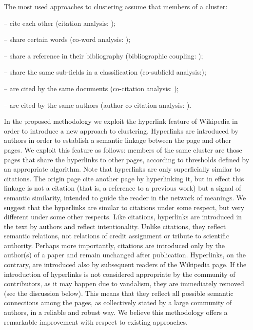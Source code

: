 \documentclass[b5paper,]{book}
\theoremstyle{definition}
\theoremstyle{definition}
\theoremstyle{definition}
\theoremstyle{remark}
\begin{document}
The most used approaches to clustering assume that members of a cluster:

-- cite each other (citation analysis:
\citep{jaffe1993geographic, moed2006citation, verspagen2007mapping, lee2017knowledge});

-- share certain words (co-word analysis:
\citep{callon1983translations, rip1984co, leydesdroff1989words, engelsman1994patent, van1993neural, yoon2004text});

-- share a reference in their bibliography (bibliographic coupling:
\citep{glanzel1996new, kuusi2007anticipating});

-- share the same sub-fields in a classification (co-subfield
analysis:\citep{chang2009using});

-- are cited by the same documents (co-citation analysis:
\citep{small1973co, small1985clustering});

-- are cited by the same authors (author co-citation analysis:
\citep{white1981author}).

In the proposed methodology we exploit the hyperlink feature of
Wikipedia in order to introduce a new approach to clustering. Hyperlinks
are introduced by authors in order to establish a semantic linkage
between the page and other pages. We exploit this feature as follows:
members of the same cluster are those pages that share the hyperlinks to
other pages, according to thresholds defined by an appropriate
algorithm. Note that hyperlinks are only superficially similar to
citations. The origin page cite another page by hyperlinking it, but in
effect this linkage is not a citation (that is, a reference to a
previous work) but a signal of semantic similarity, intended to guide
the reader in the network of meanings. We suggest that the hyperlinks
are similar to citations under some respect, but very different under
some other respects. Like citations, hyperlinks are introduced in the
text by authors and reflect intentionality. Unlike citations, they
reflect semantic relations, not relations of credit assignment or
tribute to scientific authority. Perhaps more importantly, citations are
introduced only by the author(s) of a paper and remain unchanged after
publication. Hyperlinks, on the contrary, are introduced also by
subsequent readers of the Wikipedia page. If the introduction of
hyperlinks is not considered appropriate by the community of
contributors, as it may happen due to vandalism, they are immediately
removed (see the discussion below). This means that they reflect all
possible semantic connections among the pages, as collectively stated by
a large community of authors, in a reliable and robust way. We believe
this methodology offers a remarkable improvement with respect to
existing approaches.
\end{document}
